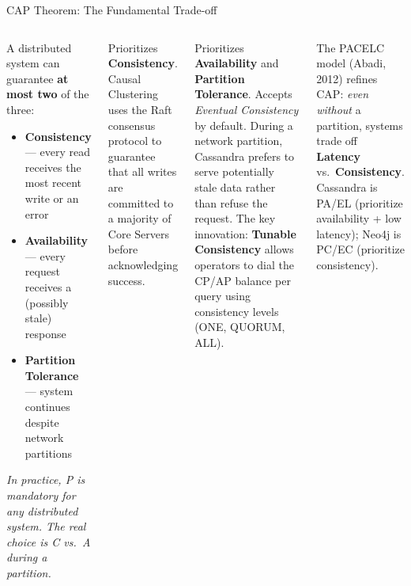 \documentclass[aspectratio=169]{beamer}
\begin{document}
\begin{frame}{CAP Theorem: The Fundamental Trade-off}
  \begin{columns}[T]
      \begin{tcolorbox}[infobox, title={CAP Theorem (Brewer, 2000)}]
        \scriptsize
        A distributed system can guarantee \textbf{at most two} of the three:
        \vspace{0.2cm}
        \begin{itemize}
          \item[\textbf{C}] \textbf{Consistency} — every read receives the most recent write or an error
          \item[\textbf{A}] \textbf{Availability} — every request receives a (possibly stale) response
          \item[\textbf{P}] \textbf{Partition Tolerance} — system continues despite network partitions
        \end{itemize}
        \vspace{0.2cm}
        \textit{In practice, P is mandatory for any distributed system. The real choice is C vs.\ A during a partition.}
      \end{tcolorbox}
      \vspace{0.3cm}
      \begin{tcolorbox}[neo4jbox, title=Neo4j Positioning: CA / CP]
        \scriptsize
        Prioritizes \textbf{Consistency}. Causal Clustering uses the Raft consensus protocol to guarantee that all writes are committed to a majority of Core Servers before acknowledging success.
      \end{tcolorbox}
      \begin{tcolorbox}[cassbox, title=Cassandra Positioning: AP]
        \scriptsize
        Prioritizes \textbf{Availability} and \textbf{Partition Tolerance}. Accepts \textit{Eventual Consistency} by default. During a network partition, Cassandra prefers to serve potentially stale data rather than refuse the request.
        \vspace{0.2cm}
        The key innovation: \textbf{Tunable Consistency} allows operators to dial the CP/AP balance per query using consistency levels (ONE, QUORUM, ALL).
      \end{tcolorbox}
      \vspace{0.2cm}
      \begin{tcolorbox}[deepdivebox, title={Deep Dive: PACELC Extension}]
        \scriptsize
        The PACELC model (Abadi, 2012) refines CAP: \textit{even without} a partition, systems trade off \textbf{Latency} vs.\ \textbf{Consistency}. Cassandra is PA/EL (prioritize availability + low latency); Neo4j is PC/EC (prioritize consistency).
      \end{tcolorbox}
  \end{columns}
\end{frame}
\end{document}
